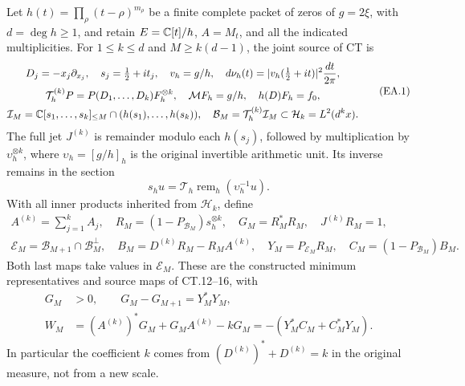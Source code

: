 Let \(h(t)=\prod_\rho(t-\rho)^{m_\rho}\) be a finite complete packet
of zeros of \(g=2\xi\), with \(d=\deg h\ge1\), and retain
\(E=\mathbb C[t]/h\), \(A=M_t\), and all the indicated multiplicities.
For \(1\le k\le d\) and \(M\ge k(d-1)\), the joint source of CT is
\[
 \begin{gathered}
 D_j=-x_j\partial_{x_j},\quad s_j=\tfrac12+it_j,\quad
 v_h=g/h,\quad d\nu_h(t)=|v_h(\tfrac12+it)|^2\frac{dt}{2\pi},\\
 \mathcal T_h^{(k)}P=P(D_1,\ldots,D_k)F_h^{\otimes k},\quad
 \mathcal MF_h=g/h,\quad h(D)F_h=f_0,\\
 \mathcal I_M=\mathbb C[s_1,\ldots,s_k]_{\le M}
                  \cap(h(s_1),\ldots,h(s_k)),\quad
 \mathcal B_M=\mathcal T_h^{(k)}\mathcal I_M
                  \subset\mathcal H_k=L^2(d^kx).
 \end{gathered}\tag{EA.1}
\]
The full jet \(J^{(k)}\) is remainder modulo each \(h(s_j)\),
followed by multiplication by \(\upsilon_h^{\otimes k}\), where
\(\upsilon_h=[g/h]_h\) is the original invertible arithmetic unit.
Its inverse remains in the section
\[
 s_hu=\mathcal T_h\operatorname{rem}_h(\upsilon_h^{-1}u).
\]
With all inner products inherited from \(\mathcal H_k\), define
\[
 \begin{gathered}
 A^{(k)}=\sum_{j=1}^k A_j,\quad
 R_M=(1-P_{\mathcal B_M})s_h^{\otimes k},\quad
 G_M=R_M^*R_M,\quad J^{(k)}R_M=1,\\
 \mathcal E_M=\mathcal B_{M+1}\cap\mathcal B_M^\perp,\quad
 B_M=D^{(k)}R_M-R_MA^{(k)},\quad
 Y_M=P_{\mathcal E_M}R_M,\quad C_M=(1-P_{\mathcal B_M})B_M.
 \end{gathered}\tag{EA.2}
\]
Both last maps take values in \(\mathcal E_M\).  These are the
constructed minimum representatives and source maps of CT.12--16, with
\[
 \begin{split}
 G_M&>0,\qquad G_M-G_{M+1}=Y_M^*Y_M,\\
 W_M&=(A^{(k)})^*G_M+G_MA^{(k)}-kG_M
                         =-(Y_M^*C_M+C_M^*Y_M).
 \end{split}\tag{EA.3}
\]
In particular the coefficient \(k\) comes from
\((D^{(k)})^*+D^{(k)}=k\) in the original measure, not from a new scale.

